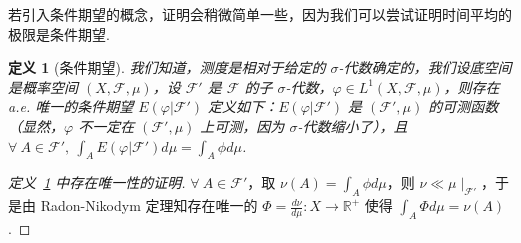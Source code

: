 \documentclass[11pt, a4paper, oneside]{ctexart}
\newtheorem{definition}[theorem]{定义}
\newcommand{\R}{\mathbb{R}}
\newcommand{\cF}{\mathcal{F}}
\begin{document}
    若引入条件期望的概念，证明会稍微简单一些，因为我们可以尝试证明时间平均的极限是条件期望.
    \begin{definition}[条件期望]\label{定义4.3}
        我们知道，测度是相对于给定的 $\sigma$-代数确定的，我们设底空间是概率空间 $(X,\cF,\mu)$，设 $\cF'$ 是 $\cF$ 的子 $\sigma$-代数，$\varphi\in L^1(X,\cF,\mu)$，则存在 a.e. 唯一的条件期望 $E(\varphi|\cF')$ 定义如下：$E(\varphi|\cF')$ 是 $(\cF',\mu)$ 的可测函数（显然，$\varphi$ 不一定在 $(\cF',\mu)$ 上可测，因为 $\sigma$-代数缩小了），且 $\forall\ A\in\cF',\ \int_{A}E(\varphi|\cF')d\mu=\int_{A}\phi d\mu$. 
    \end{definition}
    \begin{proof}[定义~\ref{定义4.3} 中存在唯一性的证明]
        $\forall\ A\in\cF'$，取 $\nu(A)=\int_{A}\phi d\mu$，则 $\nu\ll \mu\mid_{\cF'}$，于是由 Radon-Nikodym 定理知存在唯一的 $\Phi=\frac{d\nu}{d\mu}:X\to \R^+$ 使得 $\int_{A}\Phi d\mu=\nu(A)$.
    \end{proof}
\end{document}
